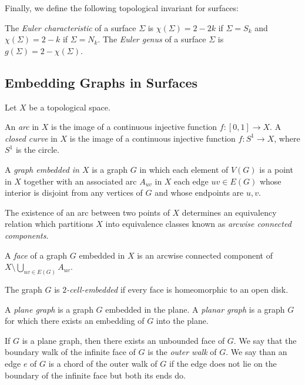 Finally, we define the following topological invariant for surfaces:

\begin{definition}
The \emph{Euler characteristic} of a surface $\Sigma$ is $\chi(\Sigma) = 2 - 2k$ if $\Sigma = S_k$
and $\chi(\Sigma) = 2 - k$ if $\Sigma = N_k$. The \emph{Euler genus} of a surface $\Sigma$ is
$g(\Sigma) = 2 - \chi(\Sigma)$. 
\end{definition}

 

\subsection{Embedding Graphs in Surfaces}

Let $X$ be a topological space. 

\begin{definition}
An \emph{arc} in $X$ is the image of a continuous injective 
function $f : [0, 1] \rightarrow X$. A \emph{closed curve} in $X$ is the image
of a continuous injective function $f : S^1 \rightarrow X$, where $S^1$ is the circle.
\end{definition}

\begin{definition}
A \emph{graph embedded in $X$} is a graph $G$ in which each element
of $V(G)$ is a point in $X$ together with an associated arc $A_{uv}$ in $X$  each edge $uv \in E(G)$ whose 
interior is disjoint from any vertices of $G$ and whose endpoints are $u, v$. 
\end{definition}

The existence of an arc between two points of $X$ determines an equivalency relation which 
partitions $X$ into equivalence classes known as \emph{arcwise connected components}.

\begin{definition}
A \emph{face} of a graph $G$ embedded in $X$ is an arcwise connected component of
$X \setminus \bigcup_{uv \in E(G)} A_{uv}$. 

The graph $G$ is \emph{$2$-cell-embedded} if every face is homeomorphic to an open disk.
\end{definition}

\begin{definition}
A \emph{plane graph} is a graph $G$ embedded in the plane. A \emph{planar graph} is a graph $G$ for which there exists an embedding of $G$ into the plane. 

If $G$ is a plane graph, then there exists an unbounded face of $G$. We say 
that the boundary walk of the infinite face of $G$ is the \emph{outer walk} of $G$. We say
than an edge $e$ of $G$ is a chord of the outer walk of $G$ if the edge does not lie on the
boundary of the infinite face but both its ends do. 
\end{definition}

